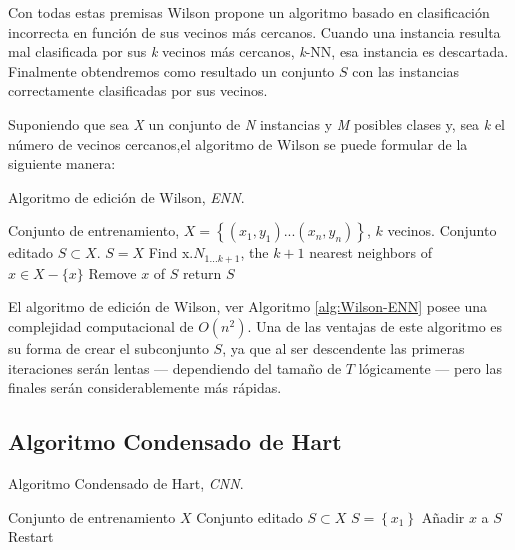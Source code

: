 Con todas estas premisas Wilson propone un algoritmo basado en clasificación incorrecta en función de sus vecinos más cercanos. Cuando una instancia resulta mal clasificada por sus \textit{k} vecinos más cercanos, \textit{k}-NN, esa instancia es descartada. Finalmente obtendremos como resultado un conjunto $S$ con las instancias correctamente clasificadas por sus vecinos.

Suponiendo que sea \textit{X} un conjunto de \textit{N} instancias y \textit{M} posibles clases y, sea \textit{k} el número de vecinos cercanos,el algoritmo de Wilson se puede formular de la siguiente manera:

\begin{algorithm}
\caption{Algoritmo de edición de Wilson, \textit{ENN}.}\label{alg:Wilson-ENN}
\begin{algorithmic}[1]
\Require Conjunto de entrenamiento, $X=\left\{(x_1,y_1)...(x_n,y_n)\right\}$, $k$ vecinos.
\Ensure Conjunto editado $S \subset X$.
\Statex
{}
	\State $S=X$
		\State Find x.$N_{1...k+1}$, the $k+1$ nearest neighbors of $x \in X - \{x\}$
			\State Remove $x$ of $S$
		\EndIf
	\EndFor
	\State return $S$
\EndProcedure
\end{algorithmic}
\end{algorithm}

El algoritmo de edición de Wilson, ver Algoritmo \ref{alg:Wilson-ENN} posee una complejidad computacional de $O(n^2)$. Una de las ventajas de este algoritmo es su forma de crear el subconjunto $S$, ya que al ser descendente las primeras iteraciones serán lentas --- dependiendo del tamaño de $T$ lógicamente --- pero las finales serán considerablemente más rápidas.


\subsection{Algoritmo Condensado de Hart}

\begin{algorithm}
\caption{Algoritmo Condensado de Hart, \textit{CNN}.}\label{alg:Hart-CNN}
\begin{algorithmic}[1]
\Require Conjunto de entrenamiento $X$
\Ensure Conjunto editado $S \subset X$
\Statex
{}
	\State $S = \left\lbrace x_1 \right\rbrace$
			\State Añadir $x$ a $S$
			\State Restart		
		\EndIf
	\EndFor
\EndProcedure
\end{algorithmic}
\end{algorithm}

